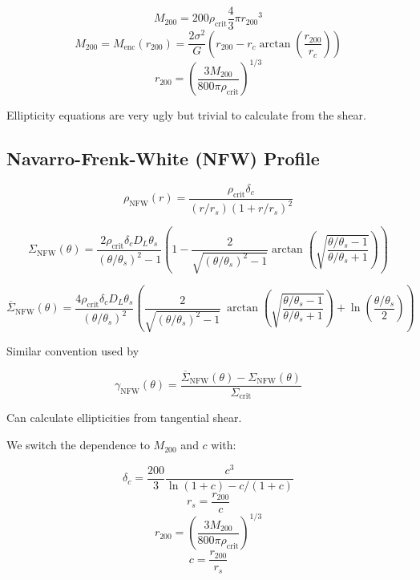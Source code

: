 \documentclass[10pt]{article}
\begin{document}
\[M_{200} = 200 \rho_\mathrm{crit} \frac{4}{3} \pi {r_{200}}^3\]
\[M_{200} = M_\mathrm{enc}(r_{200}) = \frac{2 \sigma^2}{G} \left( r_{200} - r_c \arctan{\left(\frac{r_{200}}{r_c}\right)} \right)\]
\[r_{200} = \left( \frac{3 M_{200}}{800 \pi \rho_\mathrm{crit}} \right)^{1/3}\]

Ellipticity equations are very ugly but trivial to calculate from the shear.



\subsection{Navarro-Frenk-White (NFW) Profile}

\[\rho_\mathrm{NFW}(r) = \frac{\rho_\mathrm{crit} \delta_c}{(r/r_s)\left(1 + r/r_s\right)^2}\]

%
%
%

\[\Sigma_\mathrm{NFW}(\theta) = \frac{2 \rho_\mathrm{crit} \delta_c D_L \theta_s}{(\theta/\theta_s)^2 - 1} \left(1 - \frac{2}{\sqrt{(\theta/\theta_s)^2 - 1}} \arctan\left(\sqrt{\frac{\theta/\theta_s - 1}{\theta/\theta_s + 1}} \right) \right)\]

\[\overline{\Sigma}_\mathrm{NFW}(\theta) = \frac{4 \rho_\mathrm{crit} \delta_c D_L \theta_s}{(\theta/\theta_s)^2} \left(
    \frac{2}{\sqrt{(\theta/\theta_s)^2 - 1}} ~\arctan\left(\sqrt{\frac{\theta/\theta_s - 1}{\theta/\theta_s + 1}} \right) + \ln{\left(\frac{\theta/\theta_s}{2}\right)}
\right)\]

Similar convention used by \citet{Bartelmann2001}

\[\gamma_\mathrm{NFW}(\theta) = \frac{\overline{\Sigma}_\mathrm{NFW}(\theta) - \Sigma_\mathrm{NFW}(\theta)}{\Sigma_\mathrm{crit}} \]

Can calculate ellipticities from tangential shear.

We switch the dependence to $M_{200}$ and $c$ with:

\[\delta_c = \frac{200}{3} \frac{c^3}{\ln(1 + c) - c/(1 + c)}\]
\[r_s = \frac{r_{200}}{c}\]
\[r_{200} = \left( \frac{3 M_{200}}{800 \pi \rho_\mathrm{crit}} \right)^{1/3}\]
\[c = \frac{r_{200}}{r_s}\]
\end{document}
